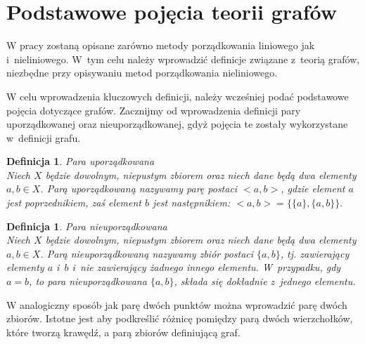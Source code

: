 \documentclass[12pt,a4paper]{report}
\newtheorem{definition}[theorem]{Definicja}
\begin{document}
\section{Podstawowe pojęcia teorii grafów}\label{grafy} %
W pracy zostaną opisane zarówno metody porządkowania liniowego jak i~nieliniowego. W~tym celu należy wprowadzić definicje związane z~teorią grafów, niezbędne przy opisywaniu metod porządkowania nieliniowego.


W celu wprowadzenia kluczowych definicji, należy wcześniej podać podstawowe pojęcia dotyczące grafów. Zacznijmy od wprowadzenia definicji pary uporządkowanej oraz nieuporządkowanej, gdyż pojęcia te zostały wykorzystane w~definicji grafu.



\begin{definition}{Para uporządkowana \cite[w oparciu o rozdział 3]{kuratowski2004}}\\
Niech $X$ będzie dowolnym, niepustym zbiorem oraz niech dane będą dwa elementy $a,b \in X$. Parą uporządkowaną nazywamy parę postaci $<a,b>$, gdzie element $a$ jest poprzednikiem, zaś element $b$ jest następnikiem: $<a,b>=\{\{a\},\{a,b\}\}.$
\end{definition}

\begin{definition}{Para nieuporządkowana \cite[w oparciu o rozdział 3]{kuratowski2004}}\\
Niech $X$ będzie dowolnym, niepustym zbiorem oraz niech dane będą dwa elementy $a,b \in X$. Parą nieuporządkowaną nazywamy zbiór postaci $\{a,b\}$, tj. zawierający elementy $a$ i~$b$ i~nie zawierający żadnego innego elementu. W~przypadku, gdy $a=b$, to para nieuporządkowana $\{a,b\}$, składa się dokładnie z~jednego elementu.
\end{definition}

W analogiczny sposób jak parę dwóch punktów można wprowadzić parę dwóch zbiorów. Istotne jest aby podkreślić różnicę pomiędzy parą dwóch wierzchołków, które tworzą krawędź, a parą zbiorów definiującą graf. 
\end{document}
